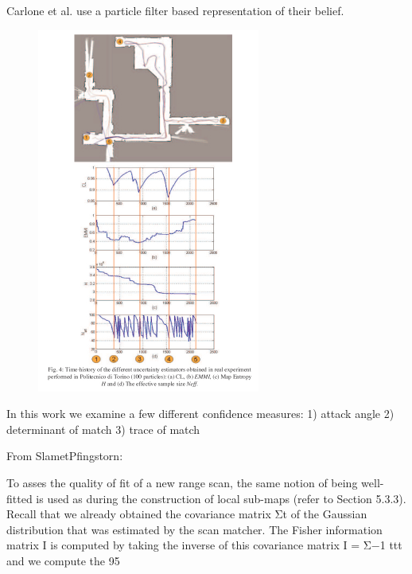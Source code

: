 Carlone et al. use a particle filter based representation of their belief. 

\begin{figure}[ht]
  \begin{center}
    \includegraphics[scale=2]{images/poster_SIDRA2009_result.pdf}
  \end{center}
  \caption{}
  \label{fig:carlone}
\end{figure}

In this work we examine a few different confidence measures:
1) attack angle
2) determinant of match
3) trace of match

From SlametPfingstorn:

To asses the quality of fit
of a new range scan, the same notion of being well-fitted is used as during the construction
of local sub-maps (refer to Section 5.3.3). Recall that we already obtained the covariance
matrix Σt of the Gaussian distribution that was estimated by the scan matcher. The Fisher
information matrix I is computed by taking the inverse of this covariance matrix I = Σ−1 ttt
and we compute the 95%